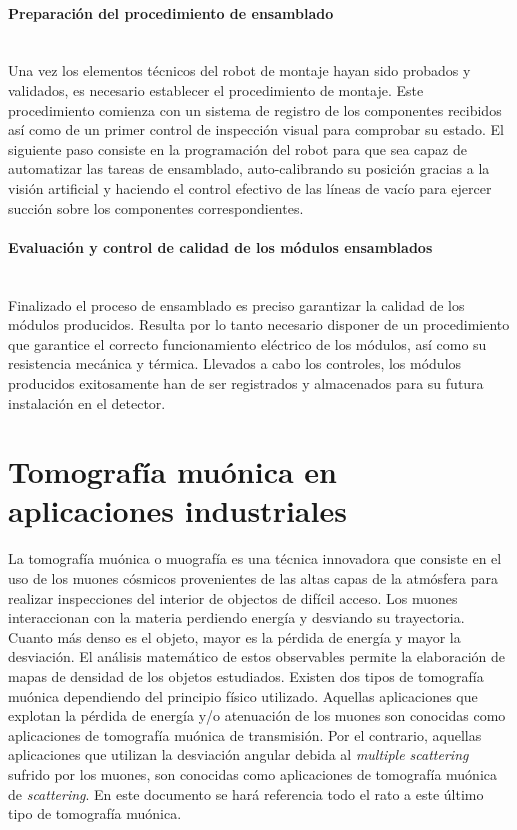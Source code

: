 \paragraph{Preparación del procedimiento de ensamblado\\\\}

Una vez los elementos técnicos del robot de montaje hayan sido probados y validados, es necesario establecer el procedimiento de montaje. Este procedimiento comienza con un sistema de registro de los componentes recibidos así como de un primer control de inspección visual para comprobar su estado. El siguiente paso consiste en la programación del robot para que sea capaz de automatizar las tareas de ensamblado, auto-calibrando su posición gracias a la visión artificial y haciendo el control efectivo de las líneas de vacío para ejercer succión sobre los componentes correspondientes. 

\paragraph{Evaluación y control de calidad de los módulos ensamblados\\\\}

Finalizado el proceso de ensamblado es preciso garantizar la calidad de los módulos producidos. Resulta por lo tanto necesario disponer de un procedimiento que garantice el correcto funcionamiento eléctrico de los módulos, así como su resistencia mecánica y térmica. Llevados a cabo los controles, los módulos producidos exitosamente han de ser registrados y almacenados para su futura instalación en el detector. 

\section{Tomografía muónica en aplicaciones industriales}

La tomografía muónica o muografía es una técnica innovadora que consiste en el uso de los muones cósmicos provenientes de las altas capas de la atmósfera para realizar inspecciones del interior de objectos de difícil acceso. Los muones interaccionan con la materia perdiendo energía y desviando su trayectoria. Cuanto más denso es el objeto, mayor es la pérdida de energía y mayor la desviación. El análisis matemático de estos observables permite la elaboración de mapas de densidad de los objetos estudiados. Existen dos tipos de tomografía muónica dependiendo del principio físico utilizado. Aquellas aplicaciones que explotan la pérdida de energía y/o atenuación de los muones son conocidas como aplicaciones de tomografía muónica de transmisión. Por el contrario, aquellas aplicaciones que utilizan la desviación angular debida al \emph{multiple scattering} sufrido por los muones, son conocidas como aplicaciones de tomografía muónica de \emph{scattering}. En este documento se hará referencia todo el rato a este último tipo de tomografía muónica. 

